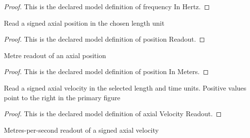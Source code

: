 \begin{proof}
  This is the declared model definition of frequency In Hertz.
\end{proof}
\begin{definition}
  \label{def:physics:phyx-mini-0171:phyxminiproblems-problemphyxmini0171-positionreadout}
  Read a signed axial position in the chosen length unit
\end{definition}
\begin{proof}
  This is the declared model definition of position Readout.
\end{proof}
\begin{definition}
  \label{def:physics:phyx-mini-0171:phyxminiproblems-problemphyxmini0171-positioninmeters}
  Metre readout of an axial position
\end{definition}
\begin{proof}
  This is the declared model definition of position In Meters.
\end{proof}
\begin{definition}
  \label{def:physics:phyx-mini-0171:phyxminiproblems-problemphyxmini0171-axialvelocityreadout}
  Read a signed axial velocity in the selected length and time units. Positive values point to the right in the primary figure
\end{definition}
\begin{proof}
  This is the declared model definition of axial Velocity Readout.
\end{proof}
\begin{definition}
  \label{def:physics:phyx-mini-0171:phyxminiproblems-problemphyxmini0171-axialvelocityinmeterspersecond}
  Metres-per-second readout of a signed axial velocity
\end{definition}
